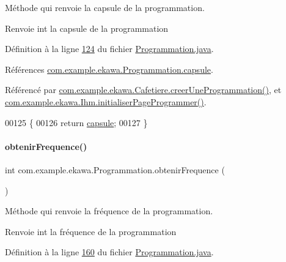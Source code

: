 Méthode qui renvoie la capsule de la programmation. 

\begin{DoxyReturn}{Renvoie}
int la capsule de la programmation 
\end{DoxyReturn}


Définition à la ligne \hyperlink{_programmation_8java_source_l00124}{124} du fichier \hyperlink{_programmation_8java_source}{Programmation.\+java}.



Références \hyperlink{_programmation_8java_source_l00076}{com.\+example.\+ekawa.\+Programmation.\+capsule}.



Référencé par \hyperlink{_cafetiere_8java_source_l00731}{com.\+example.\+ekawa.\+Cafetiere.\+creer\+Une\+Programmation()}, et \hyperlink{_ihm_8java_source_l00668}{com.\+example.\+ekawa.\+Ihm.\+initialiser\+Page\+Programmer()}.


\begin{DoxyCode}
00125     \{
00126         \textcolor{keywordflow}{return} \hyperlink{classcom_1_1example_1_1ekawa_1_1_programmation_a97573a66f9b2821a7445c69f346a5298}{capsule};
00127     \}
\end{DoxyCode}
\mbox{\label{classcom_1_1example_1_1ekawa_1_1_programmation_aa23acaed287ef27f86aec2771714a15f}} 
\paragraph{\texorpdfstring{obtenir\+Frequence()}{obtenirFrequence()}}
{\footnotesize\ttfamily int com.\+example.\+ekawa.\+Programmation.\+obtenir\+Frequence (\begin{DoxyParamCaption}{ }\end{DoxyParamCaption})}



Méthode qui renvoie la fréquence de la programmation. 

\begin{DoxyReturn}{Renvoie}
int la fréquence de la programmation 
\end{DoxyReturn}


Définition à la ligne \hyperlink{_programmation_8java_source_l00160}{160} du fichier \hyperlink{_programmation_8java_source}{Programmation.\+java}.



